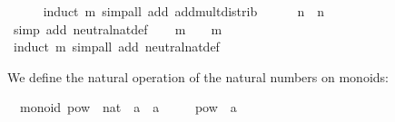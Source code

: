 \begin{isabellebody}
\ \ \ \ \isamarkupfalse%
\ {}induct\ m{}\ {}simp{}all\ add{}\ add{}mult{}distrib{}\isanewline
\ \ \isamarkupfalse%
\ {}{}\ {}\ n\ {}\ n{}\isanewline
\ \ \ \ \isamarkupfalse%
\ {}simp\ add{}\ neutral{}nat{}def{}\isanewline
\ \ \isamarkupfalse%
\ {}m\ {}\ {}\ {}\ m{}\isanewline
\ \ \ \ \isamarkupfalse%
\ {}induct\ m{}\ {}simp{}all\ add{}\ neutral{}nat{}def{}\isanewline
{}\isamarkupfalse%
\isanewline
\isanewline
{}\isamarkupfalse%
%
\endisatagquote
{\isafoldquote}%
%
\isadelimquote
%
\endisadelimquote
%
\begin{isamarkuptext}%
\noindent We define the natural operation of the natural numbers
  on monoids:%
\end{isamarkuptext}%
\isamarkuptrue%
%
\isadelimquote
%
\endisadelimquote
%
\isatagquote
{}\isamarkupfalse%
\ {}\ monoid{}\ pow\ {}{}\ {}nat\ {}\ {}a\ {}\ {}a{}\ \isanewline
\ \ \ \ {}pow\ {}\ a\ {}\ {}{}\isanewline

\end{isabellebody}
